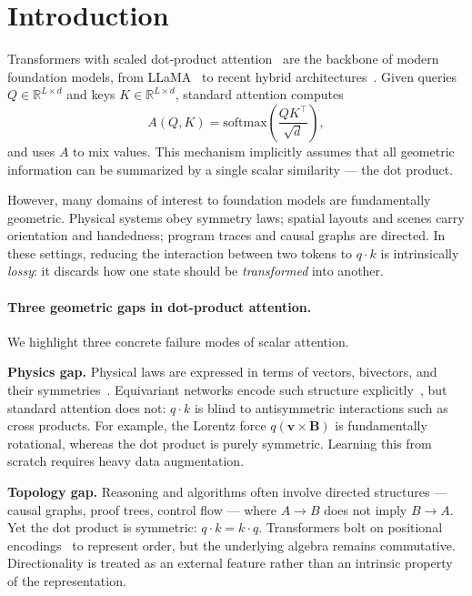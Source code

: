 \documentclass{article}
\theoremstyle{plain}
\theoremstyle{definition}
\theoremstyle{remark}
\newcommand{\R}{\mathbb{R}}
\begin{document}
\section{Introduction}
\label{sec:intro}

Transformers with scaled dot-product attention~\cite{vaswani2017attention} are the backbone of modern foundation models, from LLaMA~\cite{touvron2023llama,dubey2024llama} to recent hybrid architectures~\cite{deepseek2024v3,lieber2024jamba}. Given queries $Q \in \R^{L \times d}$ and keys $K \in \R^{L \times d}$, standard attention computes
\begin{equation}
    A(Q, K) = \mathrm{softmax}\!\left(\frac{Q K^\top}{\sqrt{d}}\right),
\end{equation}
and uses $A$ to mix values. This mechanism implicitly assumes that all geometric information can be summarized by a single scalar similarity --- the dot product.

However, many domains of interest to foundation models are fundamentally geometric. Physical systems obey symmetry laws; spatial layouts and scenes carry orientation and handedness; program traces and causal graphs are directed. In these settings, reducing the interaction between two tokens to $q \cdot k$ is intrinsically \emph{lossy}: it discards how one state should be \emph{transformed} into another.

\paragraph{Three geometric gaps in dot-product attention.}
We highlight three concrete failure modes of scalar attention.

\textbf{Physics gap.} Physical laws are expressed in terms of vectors, bivectors, and their symmetries~\cite{hestenes2012new,bronstein2021geometric}. Equivariant networks encode such structure explicitly~\cite{thomas2018tensor,satorras2021n,finzi2020generalizing,batzner2022nequip}, but standard attention does not: $q \cdot k$ is blind to antisymmetric interactions such as cross products. For example, the Lorentz force $q(\mathbf{v} \times \mathbf{B})$ is fundamentally rotational, whereas the dot product is purely symmetric. Learning this from scratch requires heavy data augmentation.

\textbf{Topology gap.} Reasoning and algorithms often involve directed structures --- causal graphs, proof trees, control flow --- where $A \rightarrow B$ does not imply $B \rightarrow A$. Yet the dot product is symmetric: $q \cdot k = k \cdot q$. Transformers bolt on positional encodings~\cite{shaw2018self,su2024roformer,press2022train} to represent order, but the underlying algebra remains commutative. Directionality is treated as an external feature rather than an intrinsic property of the representation.
\end{document}
